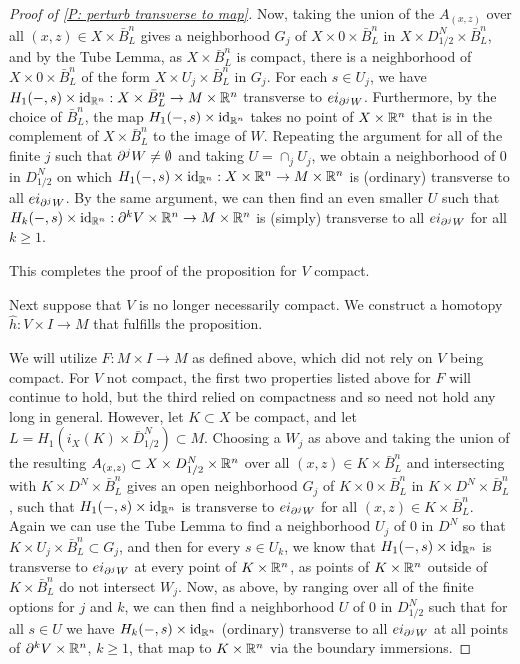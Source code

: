 \begin{proof}[Proof of \cref{P: perturb transverse to map}]
Now, taking the union of the $A_{(x,z)}$ over all $(x,z)\in X\times \bar B^n_L$ gives a neighborhood $G_j$ of $X\times 0\times \bar B^n_L$ in $X\times D_{1/2}^N\times \bar B^n_L$, and by the Tube Lemma, as $X\times \bar B^n_L$ is compact, there is a neighborhood of $X\times 0\times \bar B^n_L$ of the form $X\times U_j\times \bar B^n_L$ in $G_j$. For each $s\in U_j$, we have $H_1(-,s)\times \mathrm{id}_{\mathbb{R}^n}:X\times \bar B^n_L\to M\times \mathbb{R}^n$ transverse to $ei_{\partial^jW}$. Furthermore, by the choice of $\bar B^n_L$, the map $H_1(-,s)\times \mathrm{id}_{\mathbb{R}^n}$ takes no point of $X\times \mathbb{R}^n$ that is in the complement of $X\times \bar B^n_L$ to the image of $W$. Repeating the argument for all of the finite $j$ such that $\partial^jW\neq \emptyset$ and taking $U=\cap_j U_j$, we obtain a neighborhood of $0$ in $D_{1/2}^N$ on which  $H_1(-,s)\times \mathrm{id}_{\mathbb{R}^n}:X\times \mathbb{R}^n\to M\times \mathbb{R}^n$ is (ordinary) transverse to all $ei_{\partial^jW}$. By the same argument,  we can then find an even smaller $U$ such that $H_k(-,s)\times \mathrm{id}_{\mathbb{R}^n}:\partial^{k}V\times \mathbb{R}^n\to M\times \mathbb{R}^n$ is (simply) transverse to all $ei_{\partial^jW}$ for all $k\geq 1$. 


This completes the proof of the proposition for $V$ compact. 


Next suppose that $V$ is no longer necessarily compact. We construct a homotopy $\hat h:V\times I\to M$ that fulfills the proposition. 




We will utilize $F:M\times I\to M$ as defined above, which did not rely on $V$ being compact. For $V$ not compact, the first two properties listed above for $F$ will continue to hold, but the third relied on compactness and so need not hold any long in general.
However, let  $K\subset X$ be compact, and let $L=H_1(i_X(K)\times \bar D_{1/2}^N)\subset M$. 
Choosing a $W_j$ as above and taking the union of the resulting $A_{(x,z)}\subset X\times D_{1/2}^N\times \mathbb{R}^n$ over all $(x,z)\in K\times \bar B^n_L$ and intersecting with $K\times D^N\times \bar B^n_L$ gives an open neighborhood $G_j$ of $K\times 0\times \bar B^n_L$ in $K\times D^N\times \bar B^n_L$, such that 
 $H_1(-,s)\times \mathrm{id}_{\mathbb{R}^n}$ is transverse to $ei_{\partial^jW}$  for all $(x,z)\in K\times \bar B^n_L$. Again we can use the Tube Lemma to find a neighborhood $U_j$ of $0$ in $D^N$ so that $K\times U_j\times \bar B^n_L \subset G_j$, and then for every $s\in U_k$, we know that $H_1(-,s)\times \mathrm{id}_{\mathbb{R}^n}$ is transverse to $ei_{\partial^jW}$ at every point of $K\times \mathbb{R}^n$, as points of $K\times \mathbb{R}^n$ outside of $K\times \bar B^n_L$ do not intersect $W_j$.  Now, as above, by ranging over all of the finite options for $j$ and $k$,  we can then find a neighborhood $U$ of $0$ in $D^N_{1/2}$ such that for all $s\in U$ we have $H_k(-,s)\times \mathrm{id}_{\mathbb{R}^n}$  (ordinary) transverse to all $ei_{\partial^jW}$ at all points of $\partial^kV\times \mathbb{R}^n$, $k\geq 1$, that map to $K\times \mathbb{R}^n$ via the boundary immersions. 


\end{proof}
